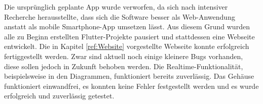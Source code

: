 \begin{inhalt}
Die ursprünglich geplante App wurde verworfen, da sich nach intensiver Recherche \cite{youtube_no_app} herausstellte, dass sich die Software besser als Web-Anwendung anstatt als mobile Smartphone-App umsetzen lässt.  
Aus diesem Grund wurden alle zu Beginn erstellten Flutter-Projekte pausiert und stattdessen eine Webseite entwickelt.  
Die in Kapitel \ref{ref:Website} vorgestellte Webseite konnte erfolgreich fertiggestellt werden.  
Zwar sind aktuell noch einige kleinere Bugs vorhanden, diese sollen jedoch in Zukunft behoben werden.  
Die Realtime-Funktionalität, beispielsweise in den Diagrammen, funktioniert bereits zuverlässig.
\vspace{0.1cm}
Das Gehäuse funktioniert einwandfrei, es konnten keine Fehler festgestellt werden und es wurde erfolgreich und zuverlässig getestet.



\end{inhalt}
